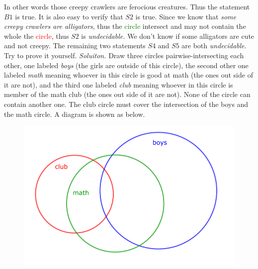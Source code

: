 \begin{multicols}{2}
	In other words those creepy crawlers are ferocious creatures. Thus the statement $B1$ is true.
	\vskip 0.1cm	
	It is also easy to verify that $S2$ is true.
	\vskip 0.1cm	
	Since we know that \textit{some creepy crawlers are alligators}, thus the \textcolor{green}{circle} intersect
	and may not contain the whole the \textcolor{red}{circle}, thus $S2$ is \textit{undecidable.}
	We don't know if some alligators are cute and not creepy.
	\vskip 0.1cm	
	The remaining two statements $S4$ and $S5$ are both \textit{undecidable}. Try to prove it yourself.
	\vskip 0.1cm
	\vskip 0.2cm
	\textit{Soluiton.} Draw three circles pairwise-intersecting each other, one labeled \textit{boys} (the girls are outside of this circle),
	the second other one labeled \textit{math} meaning whoever in this circle is good at math (the ones out side of it are not),
	and the third one labeled \textit{club} meaning whoever in this circle is member of the math club (the ones out side of it are not).
	None of the circle can contain another one. The club circle must cover the intersection of the boys and the math circle.
	A diagram is shown as below.
	\begin{figure}[H]
		\vspace*{-5pt}
		\centering
		\captionsetup{labelformat= empty, justification=centering}
		\includegraphics[width= 1\linewidth]{pi-2023-01-04.pdf}

\end{figure}
\end{multicols}
